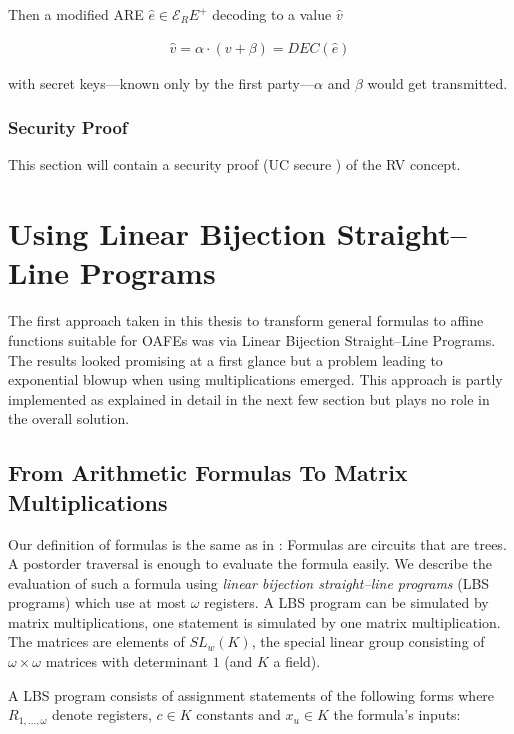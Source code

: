 \documentclass[12pt, a4paper]{article}
\begin{document}
Then a modified ARE $\hat{e} \in \mathcal{E}_RE^+$ decoding to a value $\hat{v}$

\begin{align}
\hat{v} = \alpha \cdot (v + \beta) = DEC(\hat{e})
\end{align}

with secret keys---known only by the first party---$\alpha$ and $\beta$ would
get transmitted.

\subsubsection{Security Proof}
\label{sec:randomized-variables-proof}

This section will contain a security proof (UC secure \cite{canetti05}) of the
RV concept.


\section{Using Linear Bijection Straight--Line Programs}
\label{sec:using-lbs}

The first approach taken in this thesis to transform general formulas to affine
functions suitable for OAFEs was via Linear Bijection Straight--Line Programs.
The results looked promising at a first glance but a problem leading to
exponential blowup when using multiplications emerged. This approach is partly
implemented as explained in detail in the next few section but plays no role in
the overall solution.

\subsection{From Arithmetic Formulas To Matrix Multiplications}
\label{sec:FormulasToMatrixMuls}

Our definition of formulas is the same as in \cite{cleve91}: Formulas are
circuits that are trees. A postorder traversal is enough to evaluate the formula
easily. We describe the evaluation of such a formula using \emph{linear
bijection straight--line programs} (LBS programs)\cite{cleve91} which use at
most $\omega$ registers. A LBS program can be simulated by matrix
multiplications, one statement is simulated by one matrix multiplication. The
matrices are elements of $SL_w(K)$, the special linear group consisting of
$\omega \times \omega$ matrices with determinant $1$ (and $K$ a field).

A LBS program consists of assignment statements of the following
forms where $R_{1,...,\omega}$ denote registers, $c \in K$ constants and $x_u
\in K$ the formula's inputs:
\end{document}
